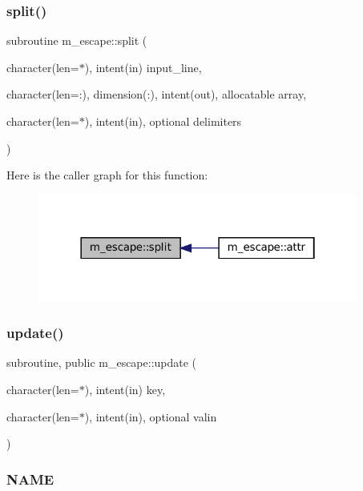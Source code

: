 \subsubsection{\texorpdfstring{split()}{split()}}
{\footnotesize\ttfamily subroutine m\+\_\+escape\+::split (\begin{DoxyParamCaption}\item[{character(len=$\ast$), intent(in)}]{input\+\_\+line,  }\item[{character(len=\+:), dimension(\+:), intent(out), allocatable}]{array,  }\item[{character(len=$\ast$), intent(in), optional}]{delimiters }\end{DoxyParamCaption})\hspace{0.3cm}{\ttfamily [private]}}

Here is the caller graph for this function\+:\nopagebreak
\begin{figure}[H]
\begin{center}
\leavevmode
\includegraphics[width=298pt]{namespacem__escape_af23bd97702864e0f32258e6ec0d51506_icgraph}
\end{center}
\end{figure}
\mbox{\label{namespacem__escape_a5efd612f60d281003917329484a7960c}} 
\subsubsection{\texorpdfstring{update()}{update()}}
{\footnotesize\ttfamily subroutine, public m\+\_\+escape\+::update (\begin{DoxyParamCaption}\item[{character(len=$\ast$), intent(in)}]{key,  }\item[{character(len=$\ast$), intent(in), optional}]{valin }\end{DoxyParamCaption})}



\subsubsection*{N\+A\+ME}

